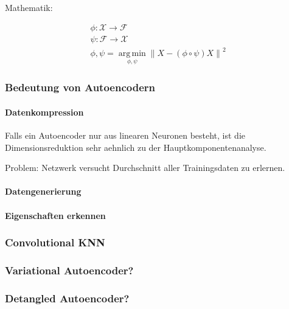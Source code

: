 \documentclass[../main]{subfiles}
\begin{document}
Mathematik:


\begin{gather}
  \phi: \mathcal{X} \to \mathcal{F}\\
  \psi: \mathcal{F} \to \mathcal{X}\\
  \displaystyle\phi,\psi = \operatorname*{arg\,min}_{\phi,\psi} \parallel {X - (\phi \circ \psi)X \parallel}^2
\end{gather}

\subsubsection{Bedeutung von Autoencodern}
\paragraph{Datenkompression}
Falls ein Autoencoder nur aus linearen Neuronen besteht, ist die
Dimensionsreduktion sehr aehnlich zu der Hauptkomponentenanalyse.

Problem: Netzwerk versucht Durchschnitt aller Trainingsdaten zu erlernen.
\paragraph{Datengenerierung}
\paragraph{Eigenschaften erkennen}

\subsubsection{Convolutional KNN}

\subsubsection{Variational Autoencoder?}
\subsubsection{Detangled Autoencoder?}
\end{document}
